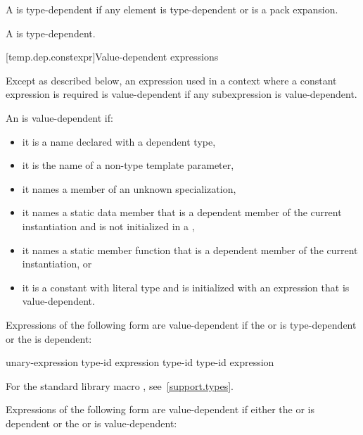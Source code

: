 \pnum
A  is type-dependent if any element is
type-dependent or is a pack expansion.

\pnum
A  is type-dependent.

[temp.dep.constexpr]{Value-dependent expressions}

\pnum
Except as described below, an expression used in a context where a
constant expression is required is value-dependent if any
subexpression is value-dependent.

\pnum
An
is value-dependent if:

\begin{itemize}
\item
it is a name declared with a dependent type,
\item
it is the name of a non-type template parameter,
\item
it names a member of an unknown specialization,
\item
it names a static data member that is a dependent member of the current
instantiation and is not initialized in a ,
\item
it names a static member function that is a dependent member of the current
instantiation, or
\item
it is a constant with literal type and is initialized with an
expression that is value-dependent.
\end{itemize}

Expressions of the following form are value-dependent if the
 or 
is type-dependent or the
is dependent:

\begin{ncbnftab}
 unary-expression\br
{} type-id \terminal{)}\br
{} expression \terminal{)}\br
{} type-id \terminal{)}\br
{} type-id \terminal{)}\br
{} \terminal{(} expression \terminal{)}
\end{ncbnftab}

\enternote For the standard library macro ,
see~\ref{support.types}.\exitnote

\pnum
Expressions of the following form are value-dependent if either the
or
is dependent or the
or
is value-dependent:


